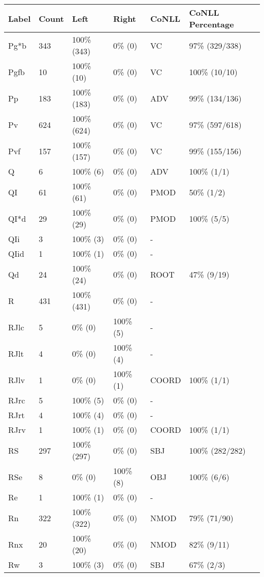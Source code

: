 \begin{figure*}
\begin{tabular}{|l|l|l|l||l|l|}
\hline
Label & Count & Left & Right & CoNLL & CoNLL Percentage\\ 
\hline
 Pg*b & 343 & 100\% (343) & 0\% (0) & VC & 97\% (329/338) \\ 
\hline
 Pgfb & 10 & 100\% (10) & 0\% (0) & VC & 100\% (10/10) \\ 
\hline
 Pp & 183 & 100\% (183) & 0\% (0) & ADV & 99\% (134/136) \\ 
\hline
 Pv & 624 & 100\% (624) & 0\% (0) & VC & 97\% (597/618) \\ 
\hline
 Pvf & 157 & 100\% (157) & 0\% (0) & VC & 99\% (155/156) \\ 
\hline
 Q & 6 & 100\% (6) & 0\% (0) & ADV & 100\% (1/1) \\ 
\hline
 QI & 61 & 100\% (61) & 0\% (0) & PMOD & 50\% (1/2) \\ 
\hline
 QI*d & 29 & 100\% (29) & 0\% (0) & PMOD & 100\% (5/5) \\ 
\hline
 QIi & 3 & 100\% (3) & 0\% (0) & - &  \\ 
\hline
 QIid & 1 & 100\% (1) & 0\% (0) & - &  \\ 
\hline
 Qd & 24 & 100\% (24) & 0\% (0) & ROOT & 47\% (9/19) \\ 
\hline
 R & 431 & 100\% (431) & 0\% (0) & - &  \\ 
\hline
 RJlc & 5 & 0\% (0) & 100\% (5) & - &  \\ 
\hline
 RJlt & 4 & 0\% (0) & 100\% (4) & - &  \\ 
\hline
 RJlv & 1 & 0\% (0) & 100\% (1) & COORD & 100\% (1/1) \\ 
\hline
 RJrc & 5 & 100\% (5) & 0\% (0) & - &  \\ 
\hline
 RJrt & 4 & 100\% (4) & 0\% (0) & - &  \\ 
\hline
 RJrv & 1 & 100\% (1) & 0\% (0) & COORD & 100\% (1/1) \\ 
\hline
 RS & 297 & 100\% (297) & 0\% (0) & SBJ & 100\% (282/282) \\ 
\hline
 RSe & 8 & 0\% (0) & 100\% (8) & OBJ & 100\% (6/6) \\ 
\hline
 Re & 1 & 100\% (1) & 0\% (0) & - &  \\ 
\hline
 Rn & 322 & 100\% (322) & 0\% (0) & NMOD & 79\% (71/90) \\ 
\hline
 Rnx & 20 & 100\% (20) & 0\% (0) & NMOD & 82\% (9/11) \\ 
\hline
 Rw & 3 & 100\% (3) & 0\% (0) & SBJ & 67\% (2/3) \\ 

\end{tabular}
\end{figure*}
